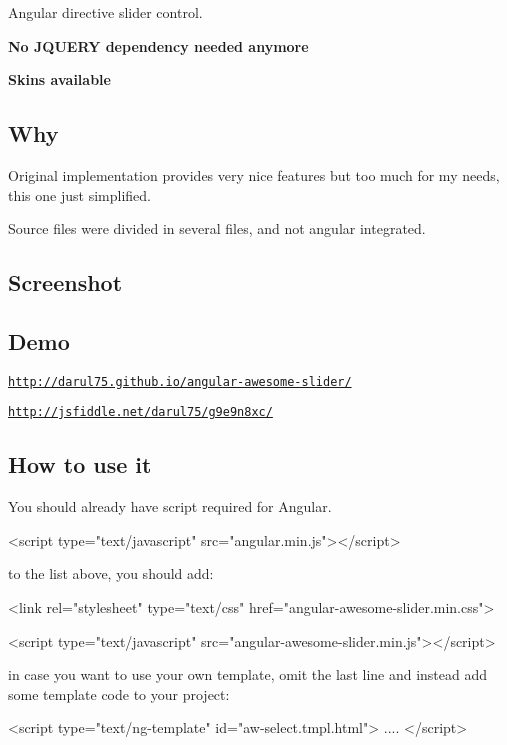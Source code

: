 Angular directive slider control.

{\bfseries No J\+Q\+U\+E\+RY dependency needed anymore}

{\bfseries Skins available}

\subsection*{Why }

Original implementation provides very nice features but too much for my needs, this one just simplified.

Source files were divided in several files, and not angular integrated.

\subsection*{Screenshot }



\subsection*{Demo }

\href{http://darul75.github.io/angular-awesome-slider/}{\tt http\+://darul75.\+github.\+io/angular-\/awesome-\/slider/}

\href{http://jsfiddle.net/darul75/g9e9n8xc/}{\tt http\+://jsfiddle.\+net/darul75/g9e9n8xc/}

\subsection*{How to use it }

You should already have script required for Angular.


\begin{DoxyCode}
<script type="text/javascript" src="angular.min.js"></script>
\end{DoxyCode}


to the list above, you should add\+:


\begin{DoxyCode}
<link rel="stylesheet" type="text/css" href="angular-awesome-slider.min.css">
\end{DoxyCode}



\begin{DoxyCode}
<script type="text/javascript" src="angular-awesome-slider.min.js"></script>
\end{DoxyCode}
 in case you want to use your own template, omit the last line and instead add some template code to your project\+: 
\begin{DoxyCode}
<script type="text/ng-template" id="aw-select.tmpl.html">
    ....
</script>
\end{DoxyCode}


